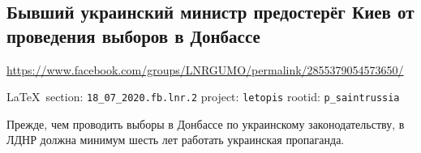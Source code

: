  
 
\subsection{Бывший украинский министр предостерёг Киев от проведения выборов в Донбассе}
\url{https://www.facebook.com/groups/LNRGUMO/permalink/2855379054573650/}
  
\vspace{0.5cm}
{\small\LaTeX~section: \verb|18_07_2020.fb.lnr.2| project: \verb|letopis| rootid: \verb|p_saintrussia|}
\vspace{0.5cm}

Прежде, чем проводить выборы в Донбассе по украинскому законодательству, в ЛДНР
должна минимум шесть лет работать украинская пропаганда. 
  
